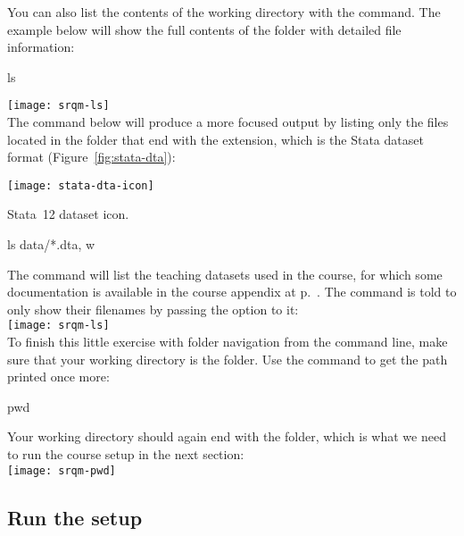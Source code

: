 	You can also list the contents of the working directory with the  command. The example below will show the full contents of the \SRQM folder with detailed file information:%
	
		\begin{docspec}
			ls
		\end{docspec}

		\texttt{[image: srqm-ls]}\\[1em]
			
	The  command below will produce a more focused output by listing only the files located in the \data folder that end with the  extension, which is the Stata dataset format (Figure~\ref{fig:stata-dta}):%

		\begin{marginfigure}
			\texttt{[image: stata-dta-icon]}
			\caption{Stata~12 dataset icon.}
			\label{fig:stata-dta}
		\end{marginfigure}

		\begin{docspec}
			ls data/*.dta, w
		\end{docspec}
			 
	The command will list the teaching datasets used in the course, for which some documentation is available in the course appendix at p.~\pageref{sec:data-sources}. The  command is told to only show their filenames by passing the  option to it:\\[1em]%
 
		\texttt{[image: srqm-ls]}\\[1em]
	
	To finish this little exercise with folder navigation from the command line, make sure that your working directory is the \SRQM folder. Use the  command to get the path printed once more:%
	
		\begin{docspec}
			pwd
		\end{docspec}
	
	Your working directory should again end with the \SRQM folder, which is what we need to run the course setup in the next section:\\[1em]%
	
		\texttt{[image: srqm-pwd]}\\[1em]
  
  \subsection{Run the \SRQM setup}%
		\label{sec:setup}%

